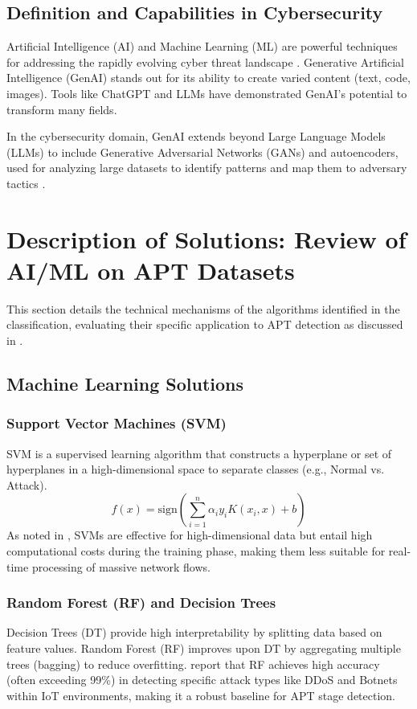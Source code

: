 \subsection{Definition and Capabilities in Cybersecurity}
Artificial Intelligence (AI) and Machine Learning (ML) are powerful techniques for addressing the rapidly evolving cyber threat landscape \cite{jiang2025mitre}. Generative Artificial Intelligence (GenAI) stands out for its ability to create varied content (text, code, images). Tools like ChatGPT and LLMs have demonstrated GenAI's potential to transform many fields.

In the cybersecurity domain, GenAI extends beyond Large Language Models (LLMs) to include Generative Adversarial Networks (GANs) and autoencoders, used for analyzing large datasets to identify patterns and map them to adversary tactics \cite{jiang2025mitre}.



\section{Description of Solutions: Review of AI/ML on APT Datasets}
\label{sec:description}

This section details the technical mechanisms of the algorithms identified in the classification, evaluating their specific application to APT detection as discussed in \cite{ankalaki2025cyber}.

\subsection{Machine Learning Solutions}

\subsubsection{Support Vector Machines (SVM)}
SVM is a supervised learning algorithm that constructs a hyperplane or set of hyperplanes in a high-dimensional space to separate classes (e.g., Normal vs. Attack). 
\begin{equation}
    f(x) = \text{sign}(\sum_{i=1}^{n} \alpha_i y_i K(x_i, x) + b)
\end{equation}
As noted in \cite{ankalaki2025cyber}, SVMs are effective for high-dimensional data but entail high computational costs during the training phase, making them less suitable for real-time processing of massive network flows.

\subsubsection{Random Forest (RF) and Decision Trees}
Decision Trees (DT) provide high interpretability by splitting data based on feature values. Random Forest (RF) improves upon DT by aggregating multiple trees (bagging) to reduce overfitting. \cite{ankalaki2025cyber} report that RF achieves high accuracy (often exceeding 99\%) in detecting specific attack types like DDoS and Botnets within IoT environments, making it a robust baseline for APT stage detection.

